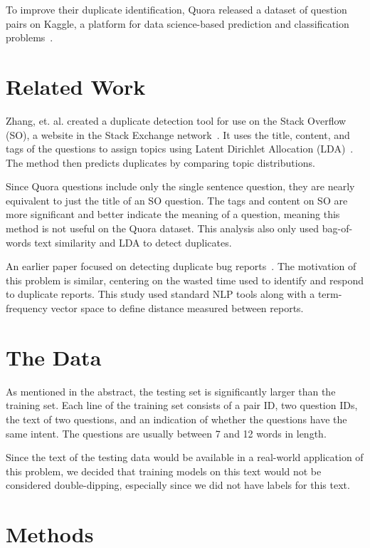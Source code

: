\documentclass{article} %
\begin{document}
To improve their duplicate identification, Quora released a dataset of question pairs on Kaggle, a platform for data science-based prediction and classification problems~\cite{kaggleComp}.



\section{Related Work}

Zhang, et. al. created a duplicate detection tool for use on the Stack Overflow (SO), a website in the Stack Exchange network~\cite{Zhang2015}. It uses the title, content, and tags of the questions to assign topics using Latent Dirichlet Allocation (LDA)~\cite{Blei03}. The method then predicts duplicates by comparing topic distributions.

Since Quora questions include only the single sentence question, they are nearly equivalent to just the title of an SO question. The tags and content on SO are more significant and better indicate the meaning of a question, meaning this method is not useful on the Quora dataset. This analysis also only used bag-of-words text similarity and LDA to detect duplicates.

An earlier paper focused on detecting duplicate bug reports~\cite{Runeson2007}. The motivation of this problem is similar, centering on the wasted time used to identify and respond to duplicate reports. This study used standard NLP tools along with a term-frequency vector space to define distance measured between reports. 

\section{The Data}

As mentioned in the abstract, the testing set is significantly larger than the training set. Each line of the training set consists of a pair ID, two question IDs, the text of two questions, and an indication of whether the questions have the same intent. The questions are usually between 7 and 12 words in length.

Since the text of the testing data would be available in a real-world application of this problem, we decided that training models on this text would not be considered double-dipping, especially since we did not have labels for this text. 

\section{Methods}
\end{document}
